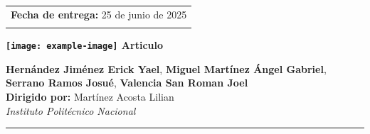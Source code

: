 \documentclass[pdflatex,sn-mathphys-num]{sn-jnl}%
\theoremstyle{thmstyleone}%
\theoremstyle{thmstyletwo}%
\theoremstyle{thmstylethree}%
\begin{document}
\makeatletter
\def\@title{\parbox[t]{\textwidth}{\justifying\LARGE\bfseries Asistente inteligente de riego en tiempo real usando machine learning en un sistema embebido para reducir los costos por consumo de agua}}
\makeatother


\vspace{1cm}

\noindent


\begin{otherlanguage}{english}
\maketitle


\vspace{0.1cm} %

\noindent
\begin{minipage}[t]{0.36\textwidth}
\raggedright
\setlength{\tabcolsep}{0pt}
\renewcommand{\arraystretch}{1.8}

\begin{tabular}{@{}l@{}}
\textbf{Fecha de entrega:} 25 de junio de 2025 \\
\\
\end{tabular}

\vspace{0.2cm}

\textbf{\texttt{[image: example-image]}\hspace{0.3em} Articulo }
\end{minipage}
\hfill
\begin{minipage}[t]{0.6\textwidth}
\raggedright
{\normalsize
\vspace{0.1cm}
\textbf{Hernández Jiménez Erick Yael}, 
\textbf{Miguel Martínez Ángel Gabriel}, 
\textbf{Serrano Ramos Josué}, 
\textbf{Valencia San Roman Joel} \\[0.3em]
\textbf{Dirigido por:} Martínez Acosta Lilian \\[0.2em]
\textit{Instituto Politécnico Nacional}
}

\vspace{0.3em}

\hrule
\vspace{0.3em}


\end{minipage}
\end{otherlanguage}
\end{document}
